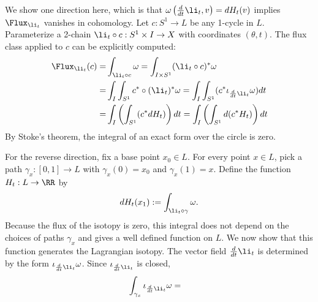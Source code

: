 

    We show one direction here, which is that  $\omega\left(\frac{d}{dt}\li_t,v\right)=dH_t(v)$ implies  $\Flux_{\li_t}$ vanishes in cohomology. 
    Let $c:S^1\to L$ be any 1-cycle in $L$.
    Parameterize a 2-chain $\li_t\circ c: S^1\times I \to X$ with coordinates $(\theta, t)$. 
    The flux class applied to $c$ can be explicitly computed: 
    \begin{align*}
        \Flux_{\li_t}(c)=&\int_{\li_t\circ c}\omega
         =\int_{I \times S^1} (\li_t\circ c )^* \omega\\
        =&\int_I \int_{S^1} c^*\circ (\li_t)^* \omega
         =\int_I \int_{S^1} (c^*  \iota_{\frac{d}{dt}\li_t}\omega ) dt\\
        =&\int_I \left(\int_{S^1} (c^* dH_t) \right)dt
         =\int_I \left(\int_{S^1} d(c^*H_t)\right) dt
    \end{align*}
    By Stoke's theorem, the integral of an exact form over the circle is zero. 
   
    For the reverse direction, fix a base point $x_0\in L$. 
    For every point $x\in L$, pick a path $\gamma_x: [0,1]\to L$ with $\gamma_x(0)=x_0$ and $\gamma_x(1)=x$.
    Define the function $H_t: L\to \RR$ by 
    \[dH_t(x_1):=\int_{\li_t\circ \gamma} \omega.\]
    Because the flux of the isotopy is zero, this integral does not depend on the choices of paths $\gamma_x$ and gives a well defined function on $L$.
    We now show that this function generates the Lagrangian isotopy.
    The vector field $\frac{d}{dt}\li_t$ is determined by the form $\iota_{\frac{d}{dt}\li_t}\omega$. 
    Since $\iota_{\frac{d}{dt}\li_t}$ is closed,  
    \begin{align*}
        \int_{\gamma_x} \iota_{\frac{d}{dt}\li_t}\omega =& 
    \end{align*}


